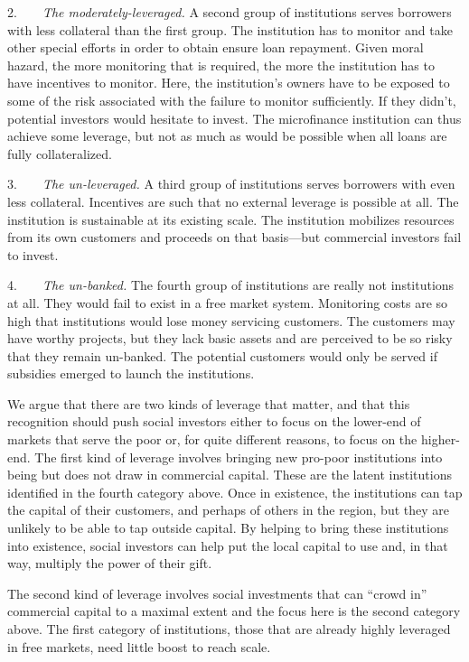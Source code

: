 \documentclass{article}
\begin{document}
2.  \emph{The moderately-leveraged.} A second group of institutions
serves borrowers with less collateral than the first group. The
institution has to monitor and take other special efforts in order to
obtain ensure loan repayment. Given moral hazard, the more monitoring
that is required, the more the institution has to have incentives to
monitor. Here, the institution's owners have to be exposed to some of
the risk associated with the failure to monitor sufficiently. If they
didn't, potential investors would hesitate to invest. The microfinance
institution can thus achieve some leverage, but not as much as would be
possible when all loans are fully collateralized.

3.  \emph{The un-leveraged.} A third group of institutions serves
borrowers with even less collateral. Incentives are such that no
external leverage is possible at all. The institution is sustainable at
its existing scale. The institution mobilizes resources from its own
customers and proceeds on that basis---but commercial investors fail to
invest.

4.  \emph{The un-banked.} The fourth group of institutions are really
not institutions at all. They would fail to exist in a free market
system. Monitoring costs are so high that institutions would lose money
servicing customers. The customers may have worthy projects, but they
lack basic assets and are perceived to be so risky that they remain
un-banked. The potential customers would only be served if subsidies
emerged to launch the institutions.

We argue that there are two kinds of leverage that matter, and that this
recognition should push social investors either to focus on the
lower-end of markets that serve the poor or, for quite different
reasons, to focus on the higher-end. The first kind of leverage involves
bringing new pro-poor institutions into being but does not draw in
commercial capital. These are the latent institutions identified in the
fourth category above. Once in existence, the institutions can tap the
capital of their customers, and perhaps of others in the region, but
they are unlikely to be able to tap outside capital. By helping to bring
these institutions into existence, social investors can help put the
local capital to use and, in that way, multiply the power of their gift.

The second kind of leverage involves social investments that can ``crowd
in'' commercial capital to a maximal extent and the focus here is the
second category above. The first category of institutions, those that
are already highly leveraged in free markets, need little boost to reach
scale.
\end{document}

